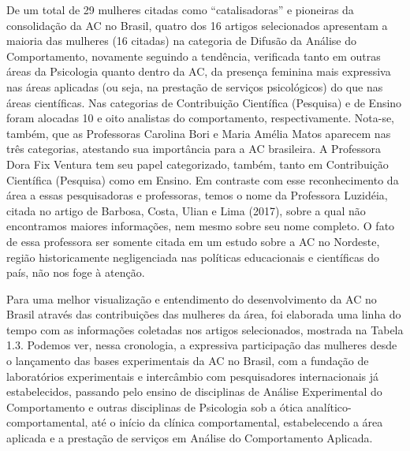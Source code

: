 De um total de 29 mulheres citadas como “catalisadoras” e pioneiras da consolidação da AC no Brasil, quatro dos 16 artigos selecionados apresentam a maioria das mulheres (16 citadas) na categoria de Difusão da Análise do Comportamento, novamente seguindo a tendência, verificada tanto em outras áreas da Psicologia quanto dentro da AC, da presença feminina mais expressiva nas áreas aplicadas (ou seja, na prestação de serviços psicológicos) do que nas áreas científicas. Nas categorias de Contribuição Científica (Pesquisa) e de Ensino foram alocadas 10 e oito analistas do comportamento, respectivamente. Nota-se, também, que as Professoras Carolina Bori e Maria Amélia Matos aparecem nas três categorias, atestando sua importância para a AC brasileira. A Professora Dora Fix Ventura tem seu papel categorizado, também, tanto em Contribuição Científica (Pesquisa) como em Ensino. Em contraste com esse reconhecimento da área a essas pesquisadoras e professoras, temos o nome da Professora Luzidéia, citada no artigo de Barbosa, Costa, Ulian e Lima (2017), sobre a qual não encontramos maiores informações, nem mesmo sobre seu nome completo. O fato de essa professora ser somente citada em um estudo sobre a AC no Nordeste, região historicamente negligenciada nas políticas educacionais e científicas do país, não nos foge à atenção.

Para uma melhor visualização e entendimento do desenvolvimento da AC no Brasil através das contribuições das mulheres da área, foi elaborada uma linha do tempo com as informações coletadas nos artigos selecionados, mostrada na Tabela 1.3. Podemos ver, nessa cronologia, a expressiva participação das mulheres desde o lançamento das bases experimentais da AC no Brasil, com a fundação de laboratórios experimentais e intercâmbio com pesquisadores internacionais já estabelecidos, passando pelo ensino de disciplinas de Análise Experimental do Comportamento e outras disciplinas de Psicologia sob a ótica analítico-comportamental, até o início da clínica comportamental, estabelecendo a área aplicada e a prestação de serviços em Análise do Comportamento Aplicada.
\vfill
\pagebreak

